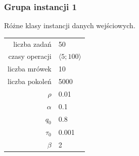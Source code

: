 \documentclass[10pt,a4paper]{article}
\begin{document}
\newpage
\subsubsection{Grupa instancji 1}
Różne klasy instancji danych wejściowych.

\begin{center}
\begin{tabular}{|r|l|}
  \hline
  liczba zadań & 50 \\
  czasy operacji & $ \langle 5;100 \rangle $  \\
  liczba mrówek & 10 \\
  liczba pokoleń & 5000 \\
  $ \rho $ & 0.01 \\
  $ \alpha $ & 0.1 \\
  $ q_0 $ & 0.8 \\
  $ \tau_0 $ & 0.001 \\
  $ \beta $ & 2 \\
  \hline
\end{tabular}
\end{center}
\end{document}
